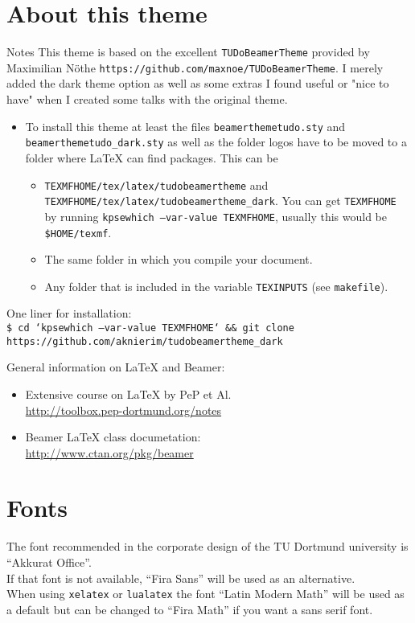 \section{About this theme}
\begin{frame}{Notes}
  This theme is based on the excellent \texttt{TUDoBeamerTheme} provided by Maximilian Nöthe \texttt{https://github.com/maxnoe/TUDoBeamerTheme}.
  I merely added the dark theme option as well as some extras I found useful or "nice to have" when I created some talks with the original theme.
  \begin{itemize}
    \item To install this theme at least the files \texttt{beamerthemetudo.sty} and \texttt{beamerthemetudo\_dark.sty} as well as the folder logos have to be moved to a folder where \LaTeX{} can find packages.
      This can be
      \begin{itemize}
        \item \texttt{TEXMFHOME/tex/latex/tudobeamertheme} and \texttt{TEXMFHOME/tex/latex/tudobeamertheme\_dark}. You can get \texttt{TEXMFHOME} by running \texttt{kpsewhich --var-value TEXMFHOME}, usually this would be \texttt{\$HOME/texmf}.
        \item The same folder in which you compile your document.
        \item Any folder that is included in the variable \texttt{TEXINPUTS} (see \texttt{makefile}).
      \end{itemize}
  \end{itemize}

  One liner for installation:\\
  \texttt{\footnotesize\$ cd `kpsewhich --var-value TEXMFHOME` \&\& git clone https://github.com/aknierim/tudobeamertheme\_dark}

  \medskip
  General information on \LaTeX{} and Beamer:
  \begin{itemize}
    \item Extensive course on \LaTeX{} by PeP et Al. \\
      \url{http://toolbox.pep-dortmund.org/notes}
    \item Beamer \LaTeX{} class documetation:\\
      \url{http://www.ctan.org/pkg/beamer}
  \end{itemize}
\end{frame}


\section{Fonts}
\begin{frame}
  The font recommended in the corporate design of the TU Dortmund university
  is \enquote{Akkurat Office}.\\
  \bigskip
  If that font is not available, \enquote{Fira Sans} will be used as an alternative.\\
  \bigskip
  When using \texttt{xelatex} or \texttt{lualatex} the font \enquote{Latin Modern Math}
  will be used as a default but can be changed to \enquote{Fira Math} if you want a
  sans serif font.
\end{frame}




